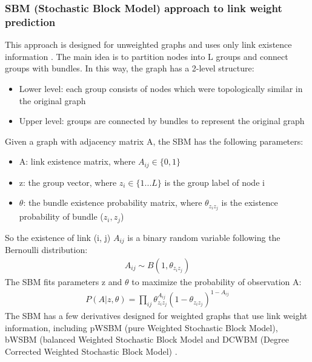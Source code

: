 \documentclass{article}
\begin{document}
\subsubsection{SBM (Stochastic Block Model) approach to link weight prediction}
This approach is designed for unweighted graphs and uses only link existence information \cite{holland1983stochastic}.
The main idea is to partition nodes into L groups and connect groups with bundles.
In this way, the graph has a 2-level structure:
\begin{itemize}
	\item Lower level: each group consists of nodes which were topologically similar in the original graph
	\item Upper level: groups are connected by bundles
	to represent the original graph
\end{itemize}
Given a graph with adjacency matrix A, the SBM has the following parameters:
\begin{itemize}
	\item A: link existence matrix, where $ A_{ij} \in \{0, 1\} $
	\item z: the group vector,
	where $ z_i \in \{ 1 ... L \} $ is the group label of node i
	\item $ \theta $: the bundle existence probability matrix,
	where $ \theta_{z_i z_j} $ is the existence probability of bundle ($z_i, z_j$)
\end{itemize}
So the existence of link (i, j) $ A_{ij} $ is a binary random variable following the Bernoulli distribution:
\begin{align*}
	A_{ij} \sim B(1, \theta_{z_i z_j})
\end{align*}
The SBM fits parameters z and $ \theta $
to maximize the probability of observation A:
\begin{align*}
	P(A|z, \theta) 
	= \prod_{ij} \theta_{z_i z_j}^{A_{ij}}(1-\theta_{z_i z_j})^{1-A_{ij}}
\end{align*}
The SBM has a few derivatives designed for weighted graphs
that use link weight information,
including pWSBM (pure Weighted Stochastic Block Model),
bWSBM (balanced Weighted Stochastic Block Model and
DCWBM (Degree Corrected Weighted Stochastic Block Model) \cite{aicher2014learning}.
\end{document}
